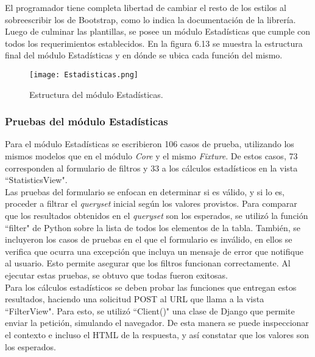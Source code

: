 El programador tiene completa libertad de cambiar el resto de los estilos al sobreescribir los de Bootstrap, como lo indica la documentación de la librería.\\

Luego de culminar las plantillas, se posee un módulo Estadísticas que cumple con todos los requerimientos establecidos. En la figura 6.13 se muestra la estructura final del módulo Estadísticas y en dónde se ubica cada función del mismo.

\begin{figure}[h]
    \centering
    \texttt{[image: Estadisticas.png]}
    \caption{ Estructura del módulo Estadísticas.}
    \label{fig:figura6.13}
\end{figure}

\subsubsection{Pruebas del módulo Estadísticas}

Para el módulo Estadísticas se escribieron 106 casos de prueba, utilizando los mismos modelos que en el módulo \textit{Core} y el mismo \textit{Fixture}. De estos casos, 73 corresponden al formulario de filtros y 33 a los cálculos estadísticos en la vista “StatisticsView". \\

Las pruebas del formulario se enfocan en determinar si es válido, y si lo es, proceder a filtrar el \textit{queryset} inicial según los valores provistos. Para comparar que los resultados obtenidos en el \textit{queryset} son los esperados, se utilizó la función “filter" de Python sobre la lista de todos los elementos de la tabla. También, se incluyeron los casos de pruebas en el que el formulario es inválido, en ellos se verifica que ocurra una excepción que incluya un mensaje de error que notifique al usuario. Esto permite asegurar que los filtros funcionan correctamente. Al ejecutar estas pruebas, se obtuvo que todas fueron exitosas.\\

Para los cálculos estadísticos se deben probar las funciones que entregan estos resultados, haciendo una solicitud POST al URL que llama a la vista “FilterView". Para esto, se utilizó “Client()" una clase de Django que permite enviar la petición, simulando el navegador. De esta manera se puede inspeccionar el contexto e incluso el HTML de la respuesta, y así constatar que los valores son los esperados.\\

